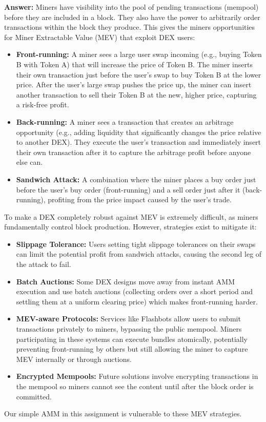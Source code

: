 \documentclass[12pt]{article}
\begin{document}
\textbf{Answer:} Miners have visibility into the pool of pending transactions (mempool) before they are included in a block. They also have the power to arbitrarily order transactions within the block they produce. This gives the miners opportunities for Miner Extractable Value (MEV) that exploit DEX users:
\begin{itemize}
    \item \textbf{Front-running:} A miner sees a large user swap incoming (e.g., buying Token B with Token A) that will increase the price of Token B. The miner inserts their own transaction just before the user's swap to buy Token B at the lower price. After the user's large swap pushes the price up, the miner can insert another transaction to sell their Token B at the new, higher price, capturing a risk-free profit.
    \item \textbf{Back-running:} A miner sees a transaction that creates an arbitrage opportunity (e.g., adding liquidity that significantly changes the price relative to another DEX). They execute the user's transaction and immediately insert their own transaction after it to capture the arbitrage profit before anyone else can.
    \item \textbf{Sandwich Attack:} A combination where the miner places a buy order just before the user's buy order (front-running) and a sell order just after it (back-running), profiting from the price impact caused by the user's trade.
\end{itemize}
To make a DEX completely robust against MEV is extremely difficult, as miners fundamentally control block production. However, strategies exist to mitigate it:
\begin{itemize}
    \item \textbf{Slippage Tolerance:} Users setting tight slippage tolerances on their swaps can limit the potential profit from sandwich attacks, causing the second leg of the attack to fail.
    \item \textbf{Batch Auctions:} Some DEX designs move away from instant AMM execution and use batch auctions (collecting orders over a short period and settling them at a uniform clearing price) which makes front-running harder.
    \item \textbf{MEV-aware Protocols:} Services like Flashbots allow users to submit transactions privately to miners, bypassing the public mempool. Miners participating in these systems can execute bundles atomically, potentially preventing front-running by others but still allowing the miner to capture MEV internally or through auctions.
    \item \textbf{Encrypted Mempools:} Future solutions involve encrypting transactions in the mempool so miners cannot see the content until after the block order is committed.
\end{itemize}
Our simple AMM in this assignment is vulnerable to these MEV strategies.
\end{document}
